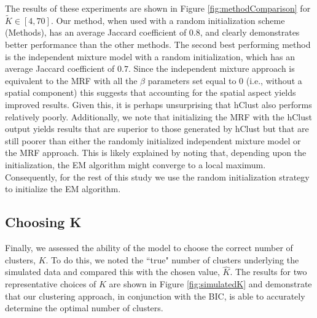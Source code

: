 	
	The results of these experiments are shown in Figure \ref{fig:methodComparison} for $\tilde{K} \in [4,70]$. Our method, when used with a random initialization scheme (Methods), has an average Jaccard coefficient of $0.8$, and clearly demonstrates better performance than the other methods. The second best performing method is the independent mixture model with a random initialization, which has an average Jaccard coefficient of $0.7$. Since the independent mixture approach is equivalent to the MRF with all the $\beta$ parameters set equal to 0 (i.e., without a spatial component) this suggests that accounting for the spatial aspect yields improved results. Given this, it is perhaps unsurprising that hClust also performs relatively poorly. Additionally, we note that initializing the MRF with the hClust output yields results that are superior to those generated by hClust but that are still poorer than either the randomly initialized independent mixture model or the MRF approach. This is likely explained by noting that, depending upon the initialization, the EM algorithm might converge to a local maximum. Consequently, for the rest of this study we use the random initialization strategy to initialize the EM algorithm. \\
	\subsection{Choosing K}
	
Finally, we assessed the ability of the model to choose the correct number of clusters, $K$. To do this, we noted the ``true" number of clusters underlying the simulated data and compared this with the chosen value, $\hat{K}$. The results for two representative choices of $K$ are shown in Figure \ref{fig:simulatedK} and demonstrate that our clustering approach, in conjunction with the BIC, is able to accurately determine the optimal number of clusters.\\

